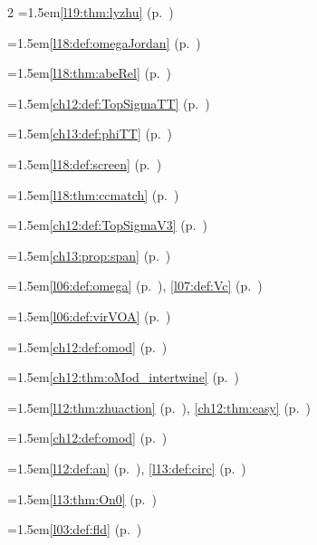 \begin{multicols}{2}
\hangindent=1.5em\quad \ref{l19:thm:lyzhu} (p.~\pageref{l19:thm:lyzhu})\par
\hangindent=1.5em\quad \ref{l18:def:omegaJordan} (p.~\pageref{l18:def:omegaJordan})\par
\hangindent=1.5em\quad \ref{l18:thm:abeRel} (p.~\pageref{l18:thm:abeRel})\par
\hangindent=1.5em\quad \ref{ch12:def:TopSigmaTT} (p.~\pageref{ch12:def:TopSigmaTT})\par
\hangindent=1.5em\quad \ref{ch13:def:phiTT} (p.~\pageref{ch13:def:phiTT})\par
\hangindent=1.5em\quad \ref{l18:def:screen} (p.~\pageref{l18:def:screen})\par
\hangindent=1.5em\quad \ref{l18:thm:ccmatch} (p.~\pageref{l18:thm:ccmatch})\par
\hangindent=1.5em\quad \ref{ch12:def:TopSigmaV3} (p.~\pageref{ch12:def:TopSigmaV3})\par
\hangindent=1.5em\quad \ref{ch13:prop:span} (p.~\pageref{ch13:prop:span})\par
\hangindent=1.5em\quad \ref{l06:def:omega} (p.~\pageref{l06:def:omega}), \ref{l07:def:Vc} (p.~\pageref{l07:def:Vc})\par
\hangindent=1.5em\quad \ref{l06:def:virVOA} (p.~\pageref{l06:def:virVOA})\par
\hangindent=1.5em\quad \ref{ch12:def:omod} (p.~\pageref{ch12:def:omod})\par
\hangindent=1.5em\quad \ref{ch12:thm:oMod_intertwine} (p.~\pageref{ch12:thm:oMod_intertwine})\par
\hangindent=1.5em\quad \ref{l12:thm:zhuaction} (p.~\pageref{l12:thm:zhuaction}), \ref{ch12:thm:easy} (p.~\pageref{ch12:thm:easy})\par
\hangindent=1.5em\quad \ref{ch12:def:omod} (p.~\pageref{ch12:def:omod})\par
\hangindent=1.5em\quad \ref{l12:def:an} (p.~\pageref{l12:def:an}), \ref{l13:def:circ} (p.~\pageref{l13:def:circ})\par
\hangindent=1.5em\quad \ref{l13:thm:On0} (p.~\pageref{l13:thm:On0})\par
\hangindent=1.5em\quad \ref{l03:def:fld} (p.~\pageref{l03:def:fld})\par

\end{multicols}
